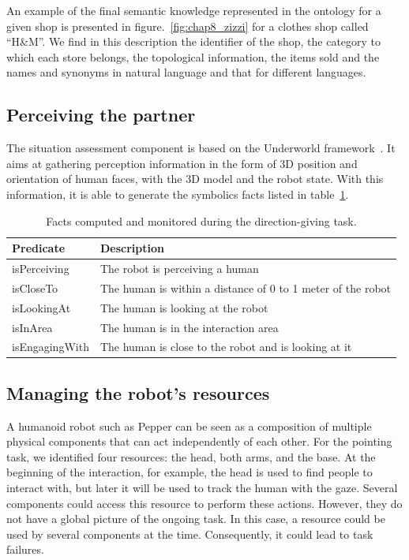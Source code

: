 An example of the final semantic knowledge represented in the ontology for a given shop is presented in figure.~\ref{fig:chap8_zizzi} for a clothes shop called ``H\&M''. We find in this description the identifier of the shop, the category to which each store belongs, the topological information, the items sold and the names and synonyms in natural language and that for different languages.

\subsection{Perceiving the partner}

The situation assessment component is based on the Underworld framework~\cite{lemaignan_2018_underworlds}. It aims at gathering perception information in the form of 3D position and orientation of human faces, with the 3D model and the robot state. With this information, it is able to generate the symbolics facts listed in table~\ref{tab:chap8_predicates}.

\begin{table}[ht!]
    \centering
    \begin{tabularx}{\textwidth}{|l|X|}
     \hline
    \textbf{Predicate} & \textbf{Description} \\
    \hline
    \hline
        isPerceiving & The robot is perceiving a human \\
        \hline
        isCloseTo & The human is within a distance of 0 to 1 meter of the robot \\
         \hline
        isLookingAt & The human is looking at the robot \\
        \hline
    \hline
        isInArea & The human is in the interaction area \\
        \hline
        isEngagingWith & The human is close to the robot and is looking at it \\
       \hline
    \end{tabularx}
    \caption{Facts computed and monitored during the direction-giving task.}
    \label{tab:chap8_predicates}
\end{table}

\subsection{Managing the robot's resources}

A humanoid robot such as Pepper can be seen as a composition of multiple physical components that can act independently of each other. For the pointing task, we identified four resources: the head, both arms, and the base. At the beginning of the interaction, for example, the head is used to find people to interact with, but later it will be used to track the human with the gaze. Several components could access this resource to perform these actions. However, they do not have a global picture of the ongoing task. In this case, a resource could be used by several components at the time. Consequently, it could lead to task failures.


